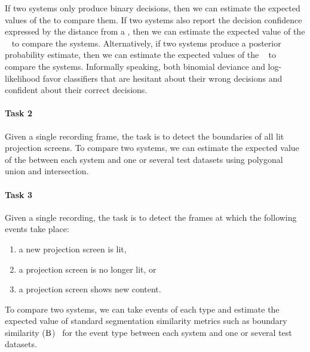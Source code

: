 If two systems only produce binary decisions, then we can estimate the expected
values of the  to compare them. If two systems
also report the decision confidence expressed by the distance from a
, then we can estimate the expected value of the
~\cite[sec.~10.6]{friedman2001elements} to compare the
systems. Alternatively, if two systems produce a posterior probability
estimate, then we can estimate the expected values of the
~\cite[sec.~2.6.3]{friedman2001elements} to compare the
systems.
Informally speaking, both binomial deviance and log-likelihood favor
classifiers that are hesitant about their wrong decisions and confident about
their correct decisions.

\paragraph{Task 2} Given a single recording frame, the task is to detect the
boundaries of all lit projection screens. To compare two systems, we can
estimate the expected value of the  between each system and
one or several test datasets using polygonal union and intersection.

\paragraph{Task 3} Given a single recording, the task is to detect the frames
at which the following events take place:
\begin{enumerate}
  \item a new projection screen is lit,
  \item a projection screen is no longer lit, or
  \item a projection screen shows new content.
\end{enumerate}
To compare two systems, we can take events of each type and estimate the
expected value of standard segmentation similarity metrics such as boundary
similarity ($\textrm B$)~\cite{P13-1167} for the event type between each system
and one or several test datasets.

